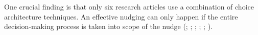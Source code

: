 One crucial finding is that only six research articles use a combination of choice architecture techniques. An effective nudging can only happen if the entire decision-making process is taken into scope of the nudge (\cite{miller_effects_2016}; \cite{hilton_tax_2014}; \cite{cosmo_nudging_2017}; \cite{mazar_if_2018}; \cite{basu_choosing_2017}; \cite{schneider_nudging_2017}). 

